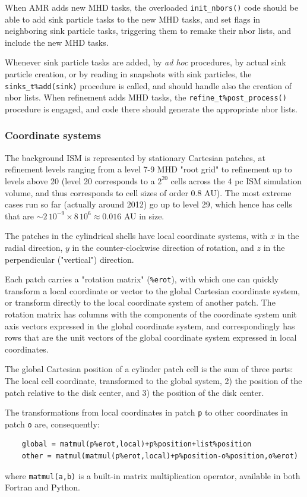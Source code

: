 \documentclass[paper=a4,fontsize=11pt]{scrartcl}
\numberwithin{equation}{section}		%
\numberwithin{figure}{section}			%
\numberwithin{table}{section}				%
\newcommand{\codecolor}{\color{Blue}}
\newcommand{\Code}[1]{{\codecolor\texttt{#1}}}
\begin{document}
When AMR adds new MHD tasks, the overloaded \Code{init\_nbors()} code should be able to add sink particle tasks to the new MHD tasks, and set flags in neighboring sink particle tasks, triggering them to remake their nbor lists, and include the new MHD tasks.

Whenever sink particle tasks are added, by \textit{ad hoc} procedures, by actual sink particle creation, or by reading in snapshots with sink particles, the \verb:sinks_t%add(sink): procedure is called, and should handle also the creation of nbor lists.   When refinement adds MHD tasks, the \verb:refine_t%post_process(): procedure is engaged, and code there should generate the appropriate nbor lists.

\subsubsection{Coordinate systems}
The background ISM is represented by stationary Cartesian patches, at refinement levels ranging from a level 7-9 MHD "root grid" to refinement up to levels above 20 (level 20 corresponds to a $2^{20}$ cells across the 4 pc ISM  simulation volume, and thus corresponds to cell sizes of order 0.8 AU).  The most extreme cases run so far (actually around 2012) go up to level 29, which hence has cells that are $\sim2\,10^{-9} \times 8\,10^6 \approx 0.016$ AU in size.  

The patches in the cylindrical shells have local coordinate systems, with $x$ in the radial direction, $y$ in the counter-clockwise direction of rotation, and $z$ in the perpendicular ("vertical") direction.

Each patch carries a "rotation matrix" (\Code{\%erot}), with which one can quickly transform a local coordinate or vector to the global Cartesian coordinate system, or transform directly to the local coordinate system of another patch.  The rotation matrix has columns with the components of the coordinate system unit axis vectors expressed in the global coordinate system, and correspondingly has rows that are the unit vectors of the global coordinate system expressed in local coordinates.

The global Cartesian position of a cylinder patch cell is the sum of three parts:  The local cell coordinate, transformed to the global system, 2) the position of the patch relative to the disk center, and 3) the position of the disk center.

The transformations from local coordinates in patch \Code{p} to other coordinates in patch \Code{o} are, consequently:
{\codecolor\begin{verbatim}
    global = matmul(p%erot,local)+p%position+list%position
    other = matmul(matmul(p%erot,local)+p%position-o%position,o%erot)
\end{verbatim}}
where \Code{matmul(a,b)} is a built-in matrix multiplication operator, available in both Fortran and Python.
\end{document}
